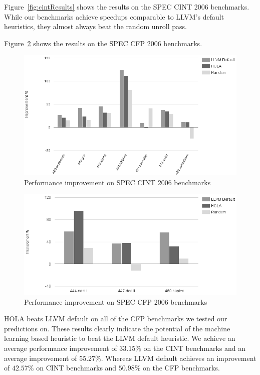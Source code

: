 \documentclass[]{sig-alternate}
\begin{document}
Figure~\ref{fig:cintResults} shows the results on the SPEC CINT 2006 benchmarks. 
While our benchmarks achieve speedups comparable to  LLVM's default heuristics, they almost always beat the random unroll pass.  

Figure~\ref{fig:cfpResults} shows the results on the SPEC CFP 2006 benchmarks. 
\begin{figure}
  \center
  \includegraphics[width=0.90\linewidth]{fig/cint.png}
  \caption{Performance improvement on SPEC CINT 2006 benchmarks}
  \label{fig:cfpResults}
\end{figure}
\begin{figure}
  \center
  \includegraphics[width=0.90\linewidth]{fig/cfp.png}
  \caption{Performance improvement on SPEC CFP 2006 benchmarks}
  \label{fig:cfpResults}
\end{figure}

HOLA beats LLVM default on all of the CFP benchmarks we tested our predictions on. These results clearly indicate the potential of the machine learning based heuristic to beat the LLVM default heuristic. We achieve an average performance improvement of $33.15 \%$  on the CINT benchmarks and an average improvement of $55.27 \%$. Whereas LLVM default achieves an improvement of $42.57 \%$ on CINT benchmarks and $50.98 \%$ on the CFP benchmarks. 
\end{document}
